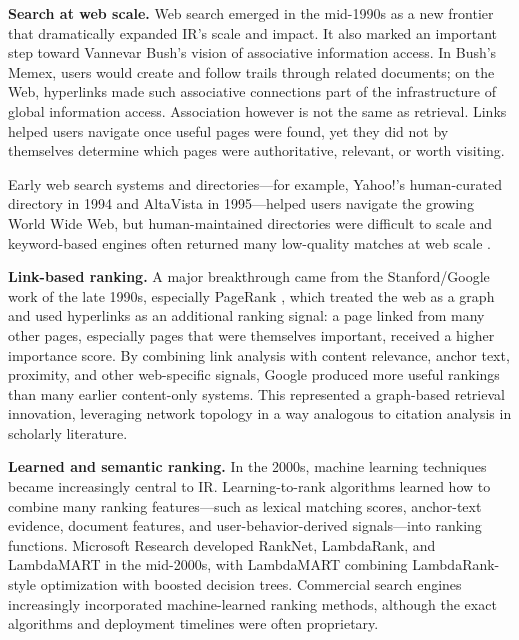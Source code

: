 \noindent\textbf{Search at web scale.}
Web search emerged in the mid-1990s as a new frontier that dramatically expanded IR's scale and impact. It also marked an important step toward Vannevar Bush's vision of associative information access. In Bush's Memex, users would create and follow trails through related documents; on the Web, hyperlinks made such associative connections part of the infrastructure of global information access. Association however is not the same as retrieval. Links helped users navigate once useful pages were found, yet they did not by themselves determine which pages were authoritative, relevant, or worth visiting.

 Early web search systems and directories---for example, Yahoo!'s human-curated directory in 1994 and AltaVista in 1995---helped users navigate the growing World Wide Web, but human-maintained directories were difficult to scale and keyword-based engines often returned many low-quality matches at web scale .

\noindent\textbf{Link-based ranking.}
A major breakthrough came from the Stanford/Google work of the late 1990s, especially PageRank , which treated the web as a graph and used hyperlinks as an additional ranking signal: a page linked from many other pages, especially pages that were themselves important, received a higher importance score. By combining link analysis with content relevance, anchor text, proximity, and other web-specific signals, Google  produced more useful rankings than many earlier content-only systems. This represented a graph-based retrieval innovation, leveraging network topology in a way analogous to citation analysis in scholarly literature.

\noindent\textbf{Learned and semantic ranking.}
In the 2000s, machine learning techniques became increasingly central to IR. Learning-to-rank algorithms  learned how to combine many ranking features---such as lexical matching scores, anchor-text evidence, document features, and user-behavior-derived signals---into ranking functions. Microsoft Research developed RankNet, LambdaRank, and LambdaMART  in the mid-2000s, with LambdaMART combining LambdaRank-style optimization with boosted decision trees. Commercial search engines increasingly incorporated machine-learned ranking methods, although the exact algorithms and deployment timelines were often proprietary.

